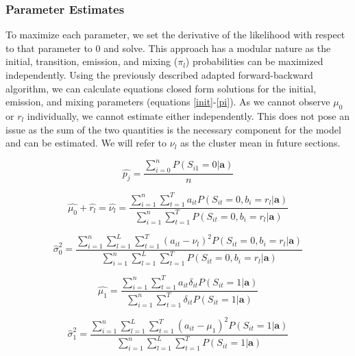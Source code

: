 \documentclass{article}
\begin{document}
\subsubsection{Parameter Estimates}

 To maximize each parameter, we set the derivative of the likelihood with respect to that parameter to 0 and solve. This approach has a modular nature as the initial, transition, emission, and mixing ($\pi_l$) probabilities can be maximized independently. Using the previously described adapted forward-backward algorithm, we can calculate equations closed form solutions for the initial, emission, and mixing parameters (equations \ref{init}-\ref{pi}). As we cannot observe $\mu_0$ or $r_l$ individually, we cannot estimate either independently. This does not pose an issue as the sum of the two quantities is the necessary component for the model and can be estimated. We will refer to $\nu_l$ as the cluster mean in future sections. 

\begin{equation}\label{init}
    \hat{p_j}  = \frac{\sum^n_{i=0} P(S_{i1}=0|\textbf{a})}{n}
\end{equation} 

\begin{equation}\label{mu0}
    \hat{\mu_0} + \hat{r_l} = \hat{\nu_l} = 
    \frac{\sum_{i=1}^n \sum_{t=1}^T a_{it}P(S_{it}=0,b_{i}=r_l|\textbf{a})}
    {\sum_{i=1}^n \sum_{t=1}^T P(S_{it}=0,b_{i}=r_l|\textbf{a})}
\end{equation} 

\begin{equation}\label{sig0}
    \hat{\sigma}_0^2 = 
    \frac{\sum_{i=1}^n \sum_{l=1}^L \sum_{t=1}^T 
        (a_{it}-\nu_l)^2 P(S_{it}=0,b_{i}=r_l|\textbf{a})}
        {\sum_{i=1}^n \sum_{l=1}^L \sum_{t=1}^T P(S_{it}=0,b_{i}=r_l|\textbf{a})}
\end{equation} 

\begin{equation}\label{mu1}
    \hat{\mu_1} = 
    \frac{\sum_{i=1}^n \sum_{t=1}^T a_{it}\delta_{it}P(S_{it}=1|\textbf{a})}
        {\sum_{i=1}^n \sum_{t=1}^T \delta_{it}P(S_{it}=1|\textbf{a})}
\end{equation} 

\begin{equation}\label{sig1}
    \hat{\sigma}_1^2 = 
    \frac{\sum_{i=1}^n \sum_{l=1}^L \sum_{t=1}^T 
        (a_{it}-\mu_1)^2 P(S_{it}=1|\textbf{a})}
        {\sum_{i=1}^n \sum_{l=1}^L \sum_{t=1}^T P(S_{it}=1|\textbf{a})}
\end{equation} 
\end{document}
